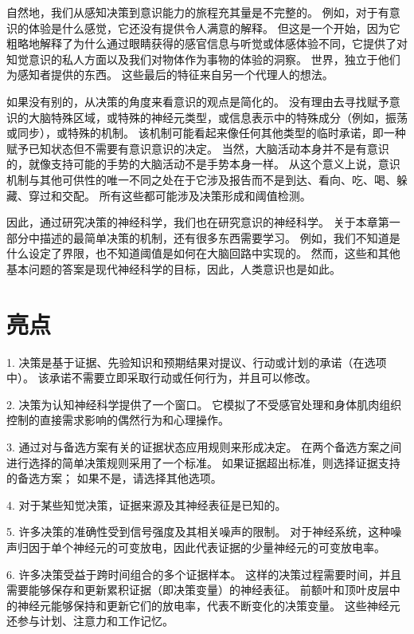 自然地，我们从感知决策到意识能力的旅程充其量是不完整的。
例如，对于有意识的体验是什么感觉，它还没有提供令人满意的解释。
但这是一个开始，因为它粗略地解释了为什么通过眼睛获得的感官信息与听觉或体感体验不同，它提供了对知觉意识的私人方面以及我们对物体作为事物的体验的洞察。
世界，独立于他们为感知者提供的东西。
这些最后的特征来自另一个代理人的想法。


如果没有别的，从决策的角度来看意识的观点是简化的。
没有理由去寻找赋予意识的大脑特殊区域，或特殊的神经元类型，或信息表示中的特殊成分（例如，振荡或同步），或特殊的机制。
该机制可能看起来像任何其他类型的临时承诺，即一种赋予已知状态但不需要有意识意识的决定。
当然，大脑活动本身并不是有意识的，就像支持可能的手势的大脑活动不是手势本身一样。
从这个意义上说，意识机制与其他可供性的唯一不同之处在于它涉及报告而不是到达、看向、吃、喝、躲藏、穿过和交配。
所有这些都可能涉及决策形成和阈值检测。


因此，通过研究决策的神经科学，我们也在研究意识的神经科学。
关于本章第一部分中描述的最简单决策的机制，还有很多东西需要学习。
例如，我们不知道是什么设定了界限，也不知道阈值是如何在大脑回路中实现的。
然而，这些和其他基本问题的答案是现代神经科学的目标，因此，人类意识也是如此。



\section{亮点}

1. 决策是基于证据、先验知识和预期结果对提议、行动或计划的承诺（在选项中）。
该承诺不需要立即采取行动或任何行为，并且可以修改。 


2. 决策为认知神经科学提供了一个窗口。
它模拟了不受感官处理和身体肌肉组织控制的直接需求影响的偶然行为和心理操作。


3. 通过对与备选方案有关的证据状态应用规则来形成决定。
在两个备选方案之间进行选择的简单决策规则采用了一个标准。
如果证据超出标准，则选择证据支持的备选方案；
如果不是，请选择其他选项。


4. 对于某些知觉决策，证据来源及其神经表征是已知的。


5. 许多决策的准确性受到信号强度及其相关噪声的限制。
对于神经系统，这种噪声归因于单个神经元的可变放电，因此代表证据的少量神经元的可变放电率。


6. 许多决策受益于跨时间组合的多个证据样本。
这样的决策过程需要时间，并且需要能够保存和更新累积证据（即决策变量）的神经表征。
前额叶和顶叶皮层中的神经元能够保持和更新它们的放电率，代表不断变化的决策变量。
这些神经元还参与计划、注意力和工作记忆。


